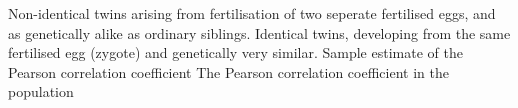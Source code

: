 % 
% 
%

 Non-identical twins arising from fertilisation of two seperate fertilised eggs, and as genetically alike as ordinary siblings.
 Identical twins, developing from the same fertilised egg (zygote) and genetically very similar.
 Sample estimate of the Pearson correlation coefficient
 The Pearson correlation coefficient in the population
